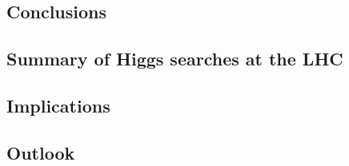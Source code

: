 \documentclass[hyper,linkcolor=blue]{mythesis}
\begin{document}
\begin{mainmatter}
  \chapter{Conclusions}
    \label{chap:conclusions}
    
    \section{Summary of Higgs searches at the LHC}
      \label{sec:searches}
      
    \section{Implications}
      \label{sec:implications}
      
    \section{Outlook}
      \label{sec:outlook}
      
\end{mainmatter}

\begin{appendices}

\end{appendices}

\begin{backmatter}
  
  
\end{backmatter}
\end{document}
